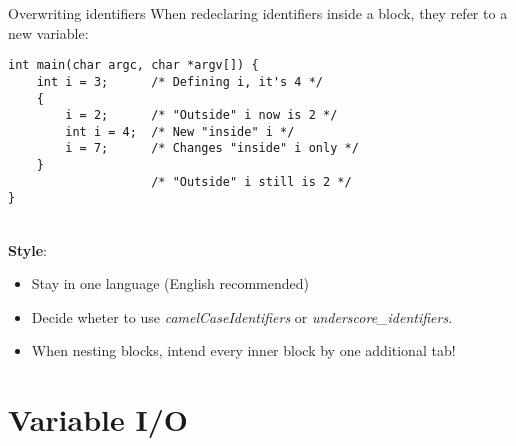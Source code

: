 \begin{frame}[fragile]{Overwriting identifiers}
	When redeclaring identifiers inside a block, they refer to a new variable:
	\begin{lstlisting}
int main(char argc, char *argv[]) {
	int i = 3;		/* Defining i, it's 4 */
	{
		i = 2;		/* "Outside" i now is 2 */
		int i = 4;	/* New "inside" i */
		i = 7;		/* Changes "inside" i only */
	}
					/* "Outside" i still is 2 */
}
\end{lstlisting}\ \\
	\textbf{Style}:\\
	\begin{itemize}
		\item Stay in one language (English recommended)
		\item Decide wheter to use \textit{camelCaseIdentifiers} or \textit{underscore\_identifiers}.\\
		\item When nesting blocks, intend every inner block by one additional tab!
	\end{itemize}
\end{frame}
\section{Variable I/O}
